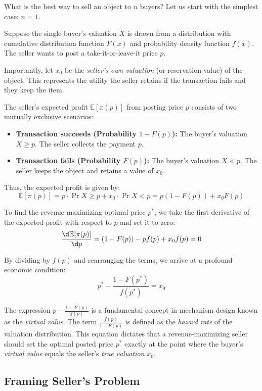 What is the best way to sell an object to $n$ buyers? Let us start with the simplest case: $n = 1$.

Suppose the single buyer's valuation $X$ is drawn from a distribution with cumulative distribution function $F(x)$ and probability density function $f(x)$. The seller wants to post a take-it-or-leave-it price $p$. 

Importantly, let $x_0$ be the \textit{seller's own valuation} (or reservation value) of the object. This represents the utility the seller retains if the transaction fails and they keep the item.

The seller's expected profit $\mathbb{E}[\pi(p)]$ from posting price $p$ consists of two mutually exclusive scenarios:
\begin{itemize}
    \item \textbf{Transaction succeeds (Probability $1-F(p)$):} The buyer's valuation $X \ge p$. The seller collects the payment $p$.
    \item \textbf{Transaction fails (Probability $F(p)$):} The buyer's valuation $X < p$. The seller keeps the object and retains a value of $x_0$.
\end{itemize}

Thus, the expected profit is given by:
\[
\mathbb{E}[\pi(p)] = p \cdot \Pr{X \ge p} + x_0 \cdot \Pr{X < p} = p(1-F(p)) + x_0 F(p)
\]

To find the revenue-maximizing optimal price $p^*$, we take the first derivative of the expected profit with respect to $p$ and set it to zero:
\[
\frac{\d \mathbb{E}[\pi(p)]}{\d p} = (1-F(p)) - pf(p) + x_0 f(p) = 0
\]

By dividing by $f(p)$ and rearranging the terms, we arrive at a profound economic condition:
\[
p^* - \frac{1-F(p^*)}{f(p^*)} = x_0
\]

The expression $p - \frac{1-F(p)}{f(p)}$ is a fundamental concept in mechanism design known as the \textit{virtual value}. The term $\frac{f(p)}{1-F(p)}$ is defined as the \textit{hazard rate} of the valuation distribution. This equation dictates that a revenue-maximizing seller should set the optimal posted price $p^*$ exactly at the point where the buyer's \textit{virtual value} equals the seller's \textit{true valuation} $x_0$. 


\subsection{Framing Seller's Problem}

